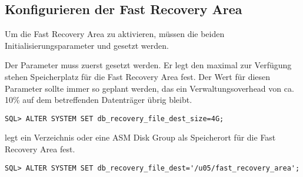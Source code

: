       \subsection{Konfigurieren der Fast Recovery Area}
        Um die Fast Recovery Area zu aktivieren, müssen die beiden Initialisierungsparameter  und  gesetzt werden.
        \begin{merke}
          Der Parameter  muss zuerst gesetzt werden. Er legt den maximal zur Verfügung stehen Speicherplatz für die Fast Recovery Area fest. Der Wert für diesen Parameter sollte immer so geplant werden, das ein Verwaltungsoverhead von ca. 10\% auf dem betreffenden Datenträger übrig bleibt.
        \end{merke}
        \begin{lstlisting}[caption={DB\_RECOVERY\_FILE\_DEST\_SIZE setzen},label=admin1033,language=oracle_sql]
SQL> ALTER SYSTEM SET db_recovery_file_dest_size=4G;
        \end{lstlisting}
        \begin{merke}
           legt ein Verzeichnis oder eine ASM Disk Group als Speicherort für die Fast Recovery Area fest.
        \end{merke}
        \begin{lstlisting}[caption={DB\_RECOVERY\_FILE\_DEST\_SIZE setzen},label=admin1034,language=oracle_sql]
SQL> ALTER SYSTEM SET db_recovery_file_dest='/u05/fast_recovery_area';
        \end{lstlisting}
